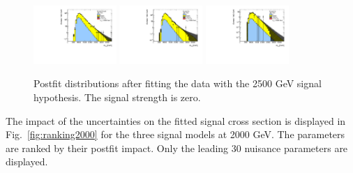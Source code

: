 \begin{figure}[htbp!]
\begin{center}
\includegraphics[width=0.28\textwidth,angle=-90]{figures/boosted/results/postfitplot_s_2500_b2b.pdf} 
\includegraphics[width=0.28\textwidth,angle=-90]{figures/boosted/results/postfitplot_s_2500_b3b.pdf} 
\includegraphics[width=0.28\textwidth,angle=-90]{figures/boosted/results/postfitplot_s_2500_b4b.pdf} 
\caption{Postfit distributions after fitting the data with the 2500 GeV signal hypothesis. The signal strength is zero.}
\label{fig:postfit2500}
\end{center}
\end{figure}

The impact of the uncertainties on the fitted signal cross section is displayed in Fig.~\ref{fig:ranking2000} for the three signal models at 2000 GeV. The parameters are ranked by their postfit impact. Only the leading 30 nuisance parameters are displayed.

